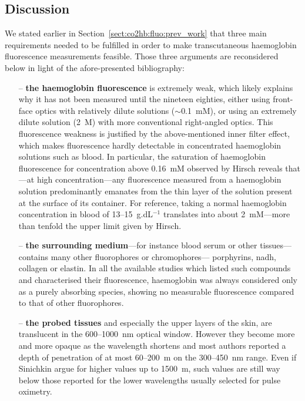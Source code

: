 \subsection{Discussion}

We stated earlier in Section~\ref{sect:co2hb:fluo:prev_work} that three main requirements needed to be fulfilled in order to make transcutaneous haemoglobin fluorescence measurements feasible. Those three arguments are reconsidered below in light of the afore-presented bibliography:

\begin{itemize}
	\item[--] \textbf{the haemoglobin fluorescence} is extremely weak, which likely explains why it has not been measured until the nineteen eighties, either using front-face optics with relatively dilute solutions ($\sim$0.1~mM)\cite{hirsch1980}, or using an extremely dilute solution (2~\textmu{}M) with more conventional right-angled optics\cite{alpert1980}. This fluorescence weakness is justified by the above-mentioned inner filter effect, which makes fluorescence hardly detectable in concentrated haemoglobin solutions such as blood. In particular, the saturation of haemoglobin fluorescence for concentration above 0.16~mM observed by Hirsch \etal{}\cite{hirsch1980} reveals that---at high concentration---any fluorescence measured from a haemoglobin solution predominantly emanates from the thin layer of the solution present at the surface of its container. For reference, taking a normal haemoglobin concentration in blood of 13--15~g.dL$^{-1}$\cite{us_hematological2005} translates into about 2~mM---more than tenfold the upper limit given by Hirsch.
	\item[--] \textbf{the surrounding medium}---for instance blood serum or other tissues---contains many other fluorophores or chromophores---\eg{} porphyrins, \gls{nadh}, collagen or elastin. In all the available studies which listed such compounds and characterised their fluorescence, haemoglobin was always considered only as a purely absorbing species, showing no measurable fluorescence compared to that of other fluorophores\cite{wolfbeis1985, wagnieres1998, kollias2002, vishwanath2011}.
	\item[--] \textbf{the probed tissues} and especially the upper layers of the skin, are translucent in the 600--1000~nm optical window. However they become more and more opaque as the wavelength shortens and most authors reported a depth of penetration of at most 60--200~\textmu{}m on the 300--450~nm range\cite{bruls1984, gmitro1988, koenig1998, barun2007, young1997}. Even if Sinichkin \etal{} argue for higher values up to 1500~\textmu{}m\cite{sinichkin1998}, such values are still way below those reported for the lower wavelengths usually selected for pulse oximetry.
\end{itemize}


